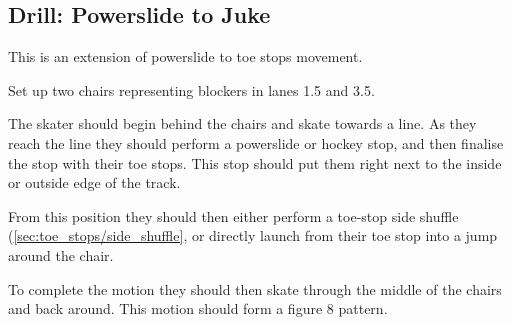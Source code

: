 \subsection*{Drill: Powerslide to Juke} 
\label{drill:toe_stops/slides/powerslide_juke}

This is an extension of powerslide to toe stops movement. 

Set up two chairs representing blockers in lanes 1.5 and 3.5. 

The skater should begin behind the chairs and skate towards a line.   
As they reach the line they should perform a powerslide or hockey stop, and then finalise the stop with their toe stops.
This stop should put them right next to the inside or outside edge of the track.

From this position they should then either perform a toe-stop side shuffle (\cref{sec:toe_stops/side_shuffle}, or directly launch from their toe stop into a jump around the chair.  

To complete the motion they should then skate through the middle of the chairs and back around.
This motion should form a figure 8 pattern.

